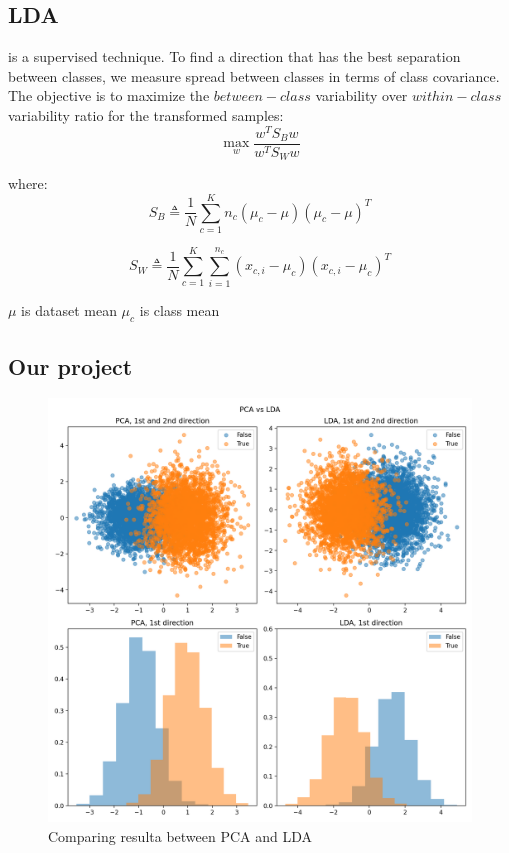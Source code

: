 
\subsection{LDA}
\label{subsec:LDA} is a supervised technique.
To find a direction that has the best separation between classes, we measure spread between classes in terms of class covariance.
The objective is to maximize the \(between-class\) variability over \(within-class\) variability ratio for the transformed samples:
\begin{equation}
    \underset{w}{\max} \frac{w^T S_B w}{w^T S_W w}
    \label{eq:ldaFunct}
\end{equation}

where:
\begin{equation}
    S_B  \triangleq \frac{1}{N}\sum_{c=1}^{K} n_c (\mu_c - \mu)(\mu_c - \mu)^T
    \label{eq:betweenClass}
\end{equation}

\begin{equation}
    S_W \triangleq \frac{1}{N}\sum_{c=1}^{K} \sum_{i=1}^{n_c} (x_{c,i} - \mu_c)(x_{c,i} - \mu_c)^T
    \label{eq:withinClass}
\end{equation}

\(\mu\) is dataset mean
\(\mu_{c}\) is class mean


\subsection{Our project}

\label{subsec:ourProject}
\begin{figure}[h!]
    \includegraphics[width=0.5\linewidth]{Lab/03. Lab 03/Images/02. PVA_LDA}
    \caption{Comparing resulta between PCA and LDA}
    \label{fig:pcaLda}
\end{figure}

